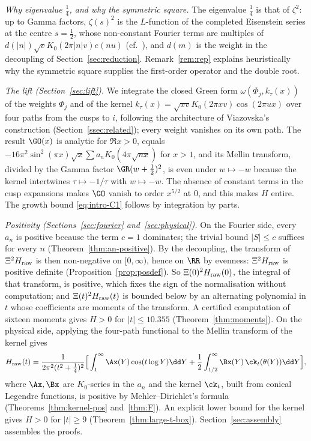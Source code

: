 \emph{Why eigenvalue $\frac14$, and why the symmetric square.} The eigenvalue $\frac14$ is that of $\zeta^2$: up to Gamma factors, $\zeta(s)^2$
is the $L$-function of the completed Eisenstein series at the centre $s=\frac12$, whose non-constant Fourier terms are multiples of
$d(|n|)\sqrt vK_0(2\pi|n|v)e(nu)$ (cf.~\cite{BC13}), and $d(m)$ is the weight in the decoupling of Section~\ref{sec:reduction}. Remark~\ref{rem:rep} explains heuristically why the symmetric square supplies the
first-order operator and the double root.

\emph{The lift (Section~\ref{sec:lift}).} We integrate the closed Green form $\omega(\Phi_j,k_\tau(x))$ of the weights $\Phi_j$ and of the kernel
$k_\tau(x)=\sqrt{xv}K_0(2\pi xv)\cos(2\pi ux)$ over four paths from the cusps to $i$, following the architecture of Viazovska's
construction (Section~\ref{ssec:related}); every weight vanishes on its own path. The result $\GO(x)$ is analytic for $\Re x>0$, equals $-16\pi^2\sin^2(\pi x)\sqrt x\sum
a_nK_0(4\pi\sqrt{nx})$ for $x>1$, and its Mellin transform, divided by the Gamma factor $\GR(w+\frac12)^2$, is even under $w\mapsto-w$ because the kernel intertwines $\tau\mapsto-1/\tau$ with
$w\mapsto-w$. The absence of constant terms in the cusp expansions makes $\GO$ vanish to order $x^{5/2}$ at $0$, and this makes $H$ entire. The
growth bound \eqref{eq:intro-C1} follows by integration by parts.

\emph{Positivity (Sections~\ref{sec:fourier} and~\ref{sec:physical}).} On the Fourier side, every $a_n$ is positive because the term $c=1$
dominates; the trivial bound $|S|\le c$ suffices for every $n$ (Theorem~\ref{thm:an-positive}). By the decoupling, the transform of
$\Xi^2H_{\rm raw}$ is then non-negative on $[0,\infty)$, hence on $\RR$ by evenness: $\Xi^2H_{\rm raw}$ is positive definite
(Proposition~\ref{prop:posdef}). So $\Xi(0)^2H_{\rm raw}(0)$, the integral of that transform, is positive, which fixes the sign of the normalisation
without computation; and $\Xi(t)^2H_{\rm raw}(t)$ is bounded below by an alternating polynomial in $t$ whose coefficients are moments of the
transform. A certified computation of sixteen moments gives $H>0$ for $|t|\le10.355$ (Theorem~\ref{thm:moments}). On the physical side, applying
the four-path functional to the Mellin transform of the kernel gives
\[
H_{\rm raw}(t)=\frac1{2\pi^2(t^2+\frac14)^2}\Big[\int_1^\infty\Ax(Y)\cos(t\log Y)\dd Y+\frac12\int_{1/2}^\infty\Bx(Y)\,\ck_t(\theta(Y))\dd Y\Big],
\]
where $\Ax,\Bx$ are $K_0$-series in the $a_n$ and the kernel $\ck_t$, built from conical Legendre functions, is positive by Mehler--Dirichlet's
formula (Theorems~\ref{thm:kernel-pos} and~\ref{thm:F}). An explicit lower bound for the kernel gives $H>0$ for $|t|\ge9$
(Theorem~\ref{thm:large-t-box}). Section~\ref{sec:assembly} assembles the proofs.

